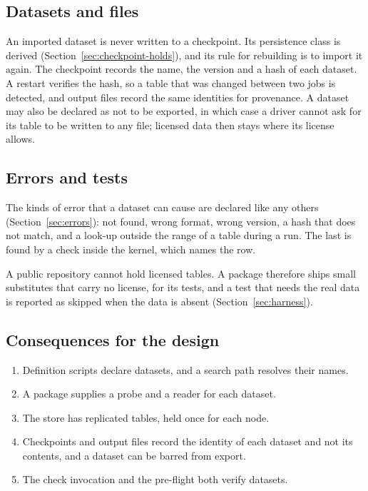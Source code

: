 \documentclass[11pt,a4paper]{article}
\begin{document}
\subsection{Datasets and files}

An imported dataset is never written to a checkpoint.  Its persistence
class is derived (Section~\ref{sec:checkpoint-holds}), and its rule for
rebuilding is to import it again.  The checkpoint records the name, the
version and a hash of each dataset.  A restart verifies the hash, so a
table that was changed between two jobs is detected, and output files
record the same identities for provenance.  A dataset may also be declared
as not to be exported, in which case a driver cannot ask for its table to
be written to any file; licensed data then stays where its license allows.

\subsection{Errors and tests}

The kinds of error that a dataset can cause are declared like any others
(Section~\ref{sec:errors}): not found, wrong format, wrong version, a hash
that does not match, and a look-up outside the range of a table during a
run.  The last is found by a check inside the kernel, which names the row.

A public repository cannot hold licensed tables.  A package therefore
ships small substitutes that carry no license, for its tests, and a test
that needs the real data is reported as skipped when the data is absent
(Section~\ref{sec:harness}).

\subsection{Consequences for the design}

\begin{enumerate}
  \item Definition scripts declare datasets, and a search path resolves
        their names.
  \item A package supplies a probe and a reader for each dataset.
  \item The store has replicated tables, held once for each node.
  \item Checkpoints and output files record the identity of each dataset
        and not its contents, and a dataset can be barred from export.
  \item The check invocation and the pre-flight both verify datasets.
\end{enumerate}
\end{document}
